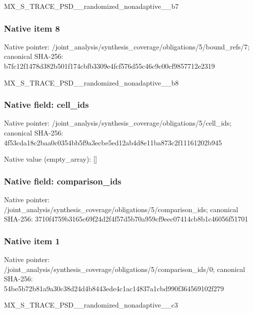 \documentclass[10pt,a4paper]{article}
\begin{document}
\begingroup\raggedright\sloppy MX\_\allowbreak{}S\_\allowbreak{}TRACE\_\allowbreak{}PSD\_\allowbreak{}\_\allowbreak{}randomized\_\allowbreak{}nonadaptive\_\allowbreak{}\_\allowbreak{}b7\par\endgroup

\subsubsection{Native item 8}
Native pointer: /joint\_\allowbreak{}analysis/synthesis\_\allowbreak{}coverage/obligations/5/bound\_\allowbreak{}refs/7; canonical SHA-256: b7fc12f1478d382b501f174cbfb3309e4fcf576d55c46c9c00cf9857712e2319

\begingroup\raggedright\sloppy MX\_\allowbreak{}S\_\allowbreak{}TRACE\_\allowbreak{}PSD\_\allowbreak{}\_\allowbreak{}randomized\_\allowbreak{}nonadaptive\_\allowbreak{}\_\allowbreak{}b8\par\endgroup

\subsubsection{Native field: cell\_\allowbreak{}ids}
Native pointer: /joint\_\allowbreak{}analysis/synthesis\_\allowbreak{}coverage/obligations/5/cell\_\allowbreak{}ids; canonical SHA-256: 4f53cda18c2baa0c0354bb5f9a3ecbe5ed12ab4d8e11ba873c2f11161202b945

Native value (empty\_\allowbreak{}array): []

\subsubsection{Native field: comparison\_\allowbreak{}ids}
Native pointer: /joint\_\allowbreak{}analysis/synthesis\_\allowbreak{}coverage/obligations/5/comparison\_\allowbreak{}ids; canonical SHA-256: 3710f4759b3165c69f24d2f4f57d5b70a959cf9eec07414cb8b1c46056f51701

\subsubsection{Native item 1}
Native pointer: /joint\_\allowbreak{}analysis/synthesis\_\allowbreak{}coverage/obligations/5/comparison\_\allowbreak{}ids/0; canonical SHA-256: 54be5b72b81a9a30c38d24d4b8443ede4c1ac14837a1cbd990f364569102f279

\begingroup\raggedright\sloppy MX\_\allowbreak{}S\_\allowbreak{}TRACE\_\allowbreak{}PSD\_\allowbreak{}\_\allowbreak{}randomized\_\allowbreak{}nonadaptive\_\allowbreak{}\_\allowbreak{}c3\par\endgroup
\end{document}
